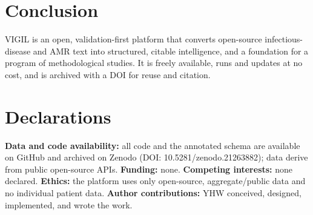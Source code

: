 \documentclass[10pt]{article}
\begin{document}
\section{Conclusion}
VIGIL is an open, validation-first platform that converts open-source
infectious-disease and AMR text into structured, citable intelligence, and a
foundation for a program of methodological studies. It is freely available, runs and
updates at no cost, and is archived with a DOI for reuse and citation.

\section*{Declarations}
\small
\textbf{Data and code availability:} all code and the annotated schema are available
on GitHub and archived on Zenodo (DOI: 10.5281/zenodo.21263882); data derive from
public open-source APIs. \textbf{Funding:} none. \textbf{Competing interests:} none
declared. \textbf{Ethics:} the platform uses only open-source, aggregate/public data
and no individual patient data. \textbf{Author contributions:} YHW conceived,
designed, implemented, and wrote the work.
\normalsize
\end{document}
